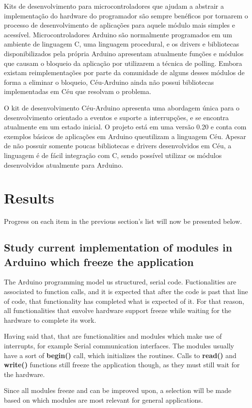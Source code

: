 \documentclass{article}
\begin{document}
\par Kits de desenvolvimento para microcontroladores que ajudam a abstrair a implementação do
hardware do programador são sempre benéficos por tornarem o processo de desenvolvimento de
aplicações para aquele módulo mais simples e acessível. Microcontroladores Arduino são
normalmente programados em um ambiente de linguagem C, uma linguagem procedural, e os drivers
e bibliotecas disponibilizados pela própria Arduino apresentam atualmente funções e módulos que
causam o bloqueio da aplicação por utilizarem a técnica de polling. Embora existam reimplementações
por parte da comunidade de alguns desses módulos de forma a eliminar o bloqueio, Céu-Arduino
ainda não possui bibliotecas implementadas em Céu que resolvam o problema.
\par O kit de desenvolvimento Céu-Arduino apresenta uma abordagem única para o desenvolvimento
orientado a eventos e suporte a interrupções, e se encontra atualmente em um estado inicial. O
projeto está em uma versão 0.20 e conta com exemplos básicos de aplicações em Arduino queutilizam a linguagem Céu. Apesar de não possuir somente poucas bibliotecas e drivers desenvolvidos
em Céu, a linguagem é de fácil integração com C, sendo possível utilizar os módulos desenvolvidos
atualmente para Arduino. \cite{githubceuarduino}

\section{Results}
\tab Progress on each item in the previous section's list will now be presented below.
\subsection{Study current implementation of modules in Arduino which freeze the application}
\tab The Arduino programming model us structured, serial code. Fuctionalities are associated to function calls, and it is expected that after the code is past that line of code, that functionality has completed what is expected of it. For that reason, all functionalities that envolve hardware support freeze while waiting for the hardware to complete its work.
\par Having said that, that are functionalities and modules which make use of interrupts, for example Serial communication interfaces. The modules usually have a sort of \textbf{begin()} call, which initializes the routines. Calls to \textbf{read()} and \textbf{write()} functions still freeze the application though, as they must still wait for the hardware.
\par Since all modules freeze and can be improved upon, a selection will be made based on which modules are most relevant for general applications.
\end{document}
